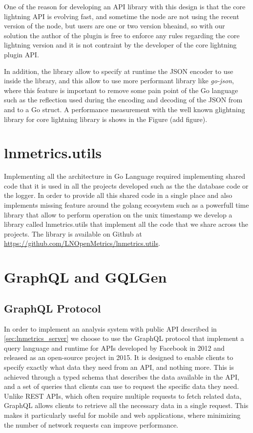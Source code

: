 One of the reason for developing an API library with this design is that 
the core lightning API is evolving fast, and sometime the node are not using the 
recent version of the node, but users are one or two version bheaind, so with our solution 
the author of the plugin is free to enforce any rules regarding the core lightning version 
and it is not contraint by the developer of the core lightning plugin API.

In addition, the library allow to specify at runtime the JSON encoder to use 
inside the library, and this allow to use more performant library like \emph{go-json}\cite{gojson}, 
where this feature is important to remove some pain point of the Go language such 
as the reflection used during the encoding and decoding of the JSON from and to a Go struct.
A performance measurement with the well known glightning library \cite{glightning} 
for core lightning library is shows in the Figure (add figure).

\section{lnmetrics.utils}

Implementing all the architecture in Go Language required implementing shared code 
that it is used in all the projects developed such as the the database code or the 
logger. In order to provide all this shared code in a single place and also implements 
missing feature around the golang ecosystem such as a powerfull time library that allow 
to perform operation on the unix timestamp we develop a library called lnmetrics.utils that
implement all the code that we share across the projects. 
The library is available on Github at \url{https://github.com/LNOpenMetrics/lnmetrics.utils}.

\section{GraphQL and GQLGen}

\subsection{GraphQL Protocol}

In order to implement an analysis system with public API described in \ref{sec:lnmetrics_server}
we choose to use the GraphQL protocol \cite{graphql} that implement  a query language and runtime for APIs 
developed by Facebook in 2012 and released as an open-source project in 2015. 
It is designed to enable clients to specify exactly what data they need from an API, 
and nothing more. This is achieved through a typed schema that describes the data 
available in the API, and a set of queries that clients can use to request the 
specific data they need.
Unlike REST APIs, which often require multiple requests to fetch related data, 
GraphQL allows clients to retrieve all the necessary data in a single request. 
This makes it particularly useful for mobile and web applications, where minimizing 
the number of network requests can improve performance.

